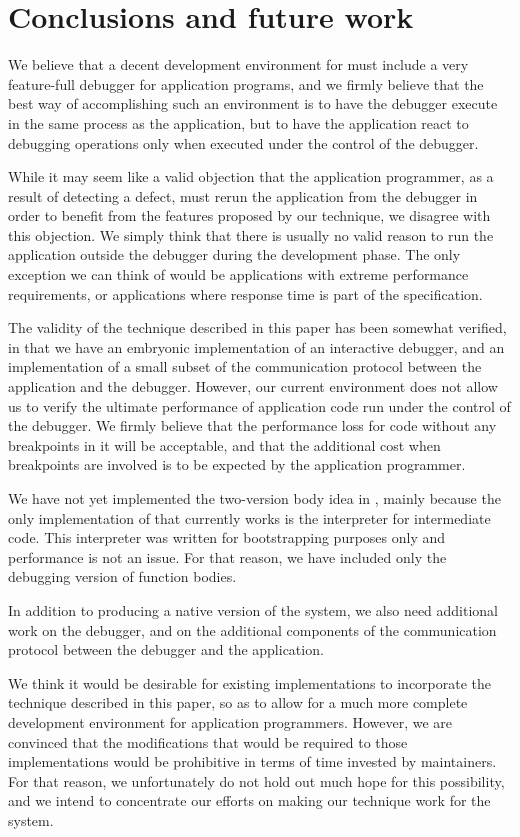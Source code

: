 \section{Conclusions and future work}

We believe that a decent development environment for \commonlisp{}
must include a very feature-full debugger for application programs, and
we firmly believe that the best way of accomplishing such an
environment is to have the debugger execute in the same process as the
application, but to have the application react to debugging operations
only when executed under the control of the debugger.

While it may seem like a valid objection that the application
programmer, as a result of detecting a defect, must rerun the
application from the debugger in order to benefit from the features
proposed by our technique, we disagree with this objection.  We simply
think that there is usually no valid reason to run the application
outside the debugger during the development phase.  The only exception
we can think of would be applications with extreme performance
requirements, or applications where response time is part of the
specification.

The validity of the technique described in this paper has been
somewhat verified, in that we have an embryonic implementation of an
interactive debugger, and an implementation of a small subset of the
communication protocol between the application and the debugger.
However, our current environment does not allow us to verify the
ultimate performance of application code run under the control of the
debugger.  We firmly believe that the performance loss for code
without any breakpoints in it will be acceptable, and that the
additional cost when breakpoints are involved is to be expected by the
application programmer.

We have not yet implemented the two-version body idea in \sicl{},
mainly because the only implementation of \sicl{} that currently works
is the interpreter for intermediate code.  This interpreter was
written for bootstrapping purposes only and performance is not an
issue.  For that reason, we have included only the debugging version
of function bodies.

In addition to producing a native version of the \sicl{} system, we
also need additional work on the \clordane{} debugger, and on the
additional components of the communication protocol between the
debugger and the application.

We think it would be desirable for existing \commonlisp{}
implementations to incorporate the technique described in this paper,
so as to allow for a much more complete development environment for
application programmers.  However, we are convinced that the
modifications that would be required to those implementations would be
prohibitive in terms of time invested by maintainers.  For that
reason, we unfortunately do not hold out much hope for this
possibility, and we intend to concentrate our efforts on making our
technique work for the \sicl{} system.

